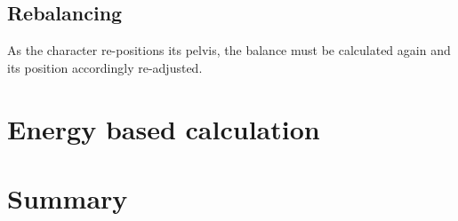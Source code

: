 \subsection{Rebalancing}
As the character re-positions its pelvis, the balance must be calculated again and its position accordingly re-adjusted.  

\section{Energy based calculation}


\section{Summary}
\label{subsection:animation_summary}